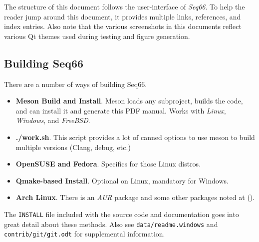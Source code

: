 \documentclass[
 11pt,
 twoside,
 a4paper,
 final                                 %
]{article}
\begin{document}
   The structure of this document follows the user-interface of
   \textsl{Seq66}.
   To help the reader jump around this document, it provides
   multiple links, references, and index entries.
   Also note that the various screenshots in this documents
   reflect various Qt themes used during testing and
   figure generation.

\subsection{Building Seq66}
\label{subsec:introduction_building_seq66}

   There are a number of ways of building Seq66.

   \begin{itemize}
      \item \textbf{Meson Build and Install}.
         Meson loads any subproject, builds the code, and can install
         it and generate this PDF manual.
         Works with \textsl{Linux}, \textsl{Windows}, and \textsl{FreeBSD}.
      \item \textbf{./work.sh}.
         This script provides a lot of canned options to use
         meson to build multiple versions (Clang, debug, etc.)
      \item \textbf{OpenSUSE and Fedora}.
         Specifics for those Linux distros.
      \item \textbf{Qmake-based Install}.
         Optional on Linux, mandatory for Windows.
      \item \textbf{Arch Linux}.
         There is an \textsl{AUR} package and some
         other packages noted at (\cite{repositories}).
   \end{itemize}

   The \texttt{INSTALL} file included with the source code and
   documentation goes into great detail about these methods.
   Also see \texttt{data/readme.windows} and \texttt{contrib/git/git.odt}
   for supplemental information.













\end{document}
